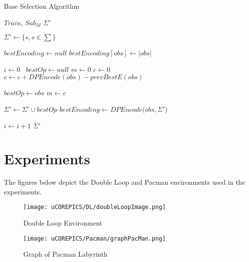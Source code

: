 \documentclass[letterpaper]{article}
\begin{document}
\begin{algorithm}
\caption{Base Selection Algorithm}
\label{Base Selection Algorithm}
\begin{algorithmic}[1]
\INPUT $Train$, $Sub_M$
\OUTPUT $\Sigma'$

\State $\Sigma' \gets \{s, s \in \sum \}$

\State $bestEncoding \gets null$
	\State $bestEncoding[obs] \gets |obs|$
\EndFor

\State $i \gets 0$\
	\State $bestOp \gets null$
	\State $m \gets 0$
		\State $c \gets 0$
			\State $c \gets c+DPEncode(obs)-prevBestE(obs)$
		\EndFor
		
			\State $bestOp \gets obs$
			\State $m \gets c$
		\EndIf
		
	\EndFor

	\State $\Sigma' \gets \Sigma' \cup bestOp$
		\State $bestEncoding \gets DPEncode(obs,\Sigma'$) 
	\EndFor	
	
	\State $i \gets i + 1$
\EndWhile 
\State \Return $\Sigma'$

\EndProcedure
\end{algorithmic}
\end{algorithm}

\newpage

\section{Experiments}

The figures below depict the Double Loop and Pacman environments used in the experiments.

\begin{figure}[ht!]
\centering
\texttt{[image: uCOREPICS/DL/doubleLoopImage.png]}
\caption{Double Loop Environment\label{overflow}}
\end{figure}

\begin{figure}[ht!]
\centering
\texttt{[image: uCOREPICS/Pacman/graphPacMan.png]}
\caption{Graph of Pacman Labyrinth\label{overflow}}
\end{figure}
\end{document}

